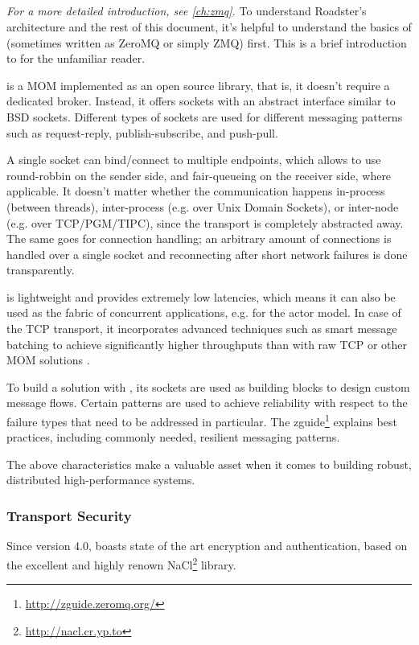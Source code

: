 \subsection{\zmq}
\emph{For a more detailed introduction, see \autoref{ch:zmq}.}
To understand Roadster's architecture and the rest of this document, it's
helpful to understand the basics of \zmq (sometimes written as ZeroMQ or simply
ZMQ) first. This is a brief introduction to \zmq for the unfamiliar reader.

\zmq is a MOM implemented as an open source library, that is, it doesn't
require a dedicated broker. Instead, it offers sockets with an abstract
interface similar to BSD sockets. Different types of sockets are used for
different messaging patterns such as request-reply, publish-subscribe, and
push-pull.

A single socket can bind/connect to multiple endpoints, which allows \zmq to
use round-robbin on the sender side, and fair-queueing on the receiver side,
where applicable. It doesn't matter whether the communication happens
in-process (between threads), inter-process (e.g. over Unix Domain Sockets), or
inter-node (e.g. over TCP/PGM/TIPC), since the transport is completely
abstracted away. The same goes for connection handling; an arbitrary amount of
connections is handled over a single socket and reconnecting after short
network failures is done transparently.

\zmq is lightweight and provides extremely low latencies, which means it can
also be used as the fabric of concurrent applications, e.g. for the actor
model. In case of the TCP transport, it incorporates advanced techniques such
as smart message batching to achieve significantly higher throughputs than with
raw TCP or other MOM solutions \cite[Figure 2, Middleware evaluation and
prototyping, p.~4]{cern:new-cmw}.

To build a solution with \zmq, its sockets are used as building blocks to
design custom message flows. Certain patterns are used to achieve reliability
with respect to the failure types that need to be addressed in particular.  The
zguide\footnote{\url{http://zguide.zeromq.org/}} explains best practices,
including commonly needed, resilient messaging patterns.

The above characteristics make \zmq a valuable asset when it comes to building
robust, distributed high-performance systems.

\subsubsection{Transport Security}
Since version 4.0, \zmq boasts state of the art encryption and authentication,
based on the excellent and highly renown
NaCl\footnote{\url{http://nacl.cr.yp.to}} library.

